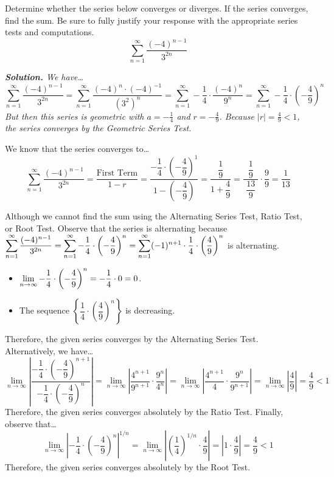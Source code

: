 \documentclass[12pt,letterpaper]{exam}
\begin{document}
\begin{questions}
\newpage
\question[10] Determine whether the series below converges or diverges. If the series converges, find the sum. Be sure to fully justify your response with the appropriate series tests and computations. 
	\[
	\sum_{n=1}^\infty \dfrac{(-4)^{n-1}}{3^{2n}}
	\] \pspace

{\itshape \textbf{Solution.} We have\dots
	\[
	\sum_{n=1}^\infty \dfrac{(-4)^{n-1}}{3^{2n}}= \sum_{n=1}^\infty \dfrac{(-4)^n \cdot (-4)^{-1}}{(3^2)^n}= \sum_{n=1}^\infty -\dfrac{1}{4} \cdot \dfrac{(-4)^n}{9^n}= \sum_{n=1}^\infty -\dfrac{1}{4} \cdot \left( -\dfrac{4}{9} \right)^n
	\]
But then this series is geometric with $a= -\frac{1}{4}$ and $r= -\frac{4}{9}$. Because $|r|= \frac{4}{9} < 1$, the series converges by the Geometric Series Test. \pspace

We know that the series converges to\dots
	\[
	\sum_{n=1}^\infty \dfrac{(-4)^{n-1}}{3^{2n}}= \dfrac{\text{First Term}}{1 - r}= \dfrac{-\dfrac{1}{4} \cdot \left( -\dfrac{4}{9} \right)^1}{1 - \left(-\dfrac{4}{9}\right)}= \dfrac{\;\;\dfrac{1}{9}\;\;}{1 + \dfrac{4}{9}}= \dfrac{\;\;\dfrac{1}{9}\;\;}{\dfrac{13}{9}} \cdot \dfrac{9}{9}= \dfrac{1}{13}
	\] \pspace

Although we cannot find the sum using the Alternating Series Test, Ratio Test, or Root Test. Observe that the series is alternating because $\displaystyle\sum_{n=1}^\infty \dfrac{(-4)^{n-1}}{3^{2n}}= \sum_{n=1}^\infty -\dfrac{1}{4} \cdot \left( -\dfrac{4}{9} \right)^n= \sum_{n=1}^\infty (-1)^{n + 1} \cdot \dfrac{1}{4} \cdot \left( \dfrac{4}{9} \right)^n$ is alternating. 
	\begin{itemize}
	\item $\displaystyle\lim_{n \to \infty} -\dfrac{1}{4} \cdot \left( -\dfrac{4}{9} \right)^n= -\dfrac{1}{4} \cdot 0= 0$.
	\item The sequence $\left\{ \dfrac{1}{4} \cdot \left( \dfrac{4}{9} \right)^n \right\}$ is decreasing.
	\end{itemize}
Therefore, the given series converges by the Alternating Series Test. Alternatively, we have\dots
	\[
	\lim_{n \to \infty} \left| \dfrac{-\dfrac{1}{4} \cdot \left( -\dfrac{4}{9} \right)^{n + 1}}{-\dfrac{1}{4} \cdot \left( -\dfrac{4}{9} \right)^n} \right|= \lim_{n \to \infty} \left| \dfrac{4^{n+1}}{9^{n+1}} \cdot \dfrac{9^n}{4^n} \right|= \lim_{n \to \infty} \left| \dfrac{4^{n+1}}{4} \cdot \dfrac{9^n}{9^{n+1}} \right|= \lim_{n \to \infty} \left| \dfrac{4}{9} \right|= \dfrac{4}{9} < 1
	\]
Therefore, the given series converges absolutely by the Ratio Test. Finally, observe that\dots
	\[
	\lim_{n \to \infty} \left| -\dfrac{1}{4} \cdot \left( -\dfrac{4}{9} \right)^n \right|^{1/n}= \lim_{n \to \infty} \left| \left( \dfrac{1}{4} \right)^{1/n} \cdot \dfrac{4}{9} \right|= \left| 1 \cdot \dfrac{4}{9} \right|= \dfrac{4}{9} < 1
	\]
Therefore, the given series converges absolutely by the Root Test. 
}




\end{questions}
\end{document}
